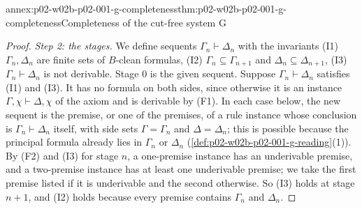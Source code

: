 \begin{annexitem}{annex:p02-w02b-p02-001-g-completeness}{thm:p02-w02b-p02-001-g-completeness}{Completeness of the cut-free system G}
\begin{proof}
\emph{Step 2: the stages.}  We define sequents \(\Gamma_n\vdash\Delta_n\)
with the invariants (I1) \(\Gamma_n,\Delta_n\) are finite sets of
\(B\)-clean formulas, (I2) \(\Gamma_n\subseteq\Gamma_{n+1}\) and
\(\Delta_n\subseteq\Delta_{n+1}\), (I3) \(\Gamma_n\vdash\Delta_n\) is not
derivable.  Stage \(0\) is the given sequent.  Suppose
\(\Gamma_n\vdash\Delta_n\) satisfies (I1) and (I3).  It has no formula on
both sides, since otherwise it is an instance \(\Gamma,\chi\vdash\Delta,\chi\)
of the axiom and is derivable by (F1).  In each case below, the new
sequent is the premise, or one of the premises, of a rule instance whose
conclusion is \(\Gamma_n\vdash\Delta_n\) itself, with side sets
\(\Gamma=\Gamma_n\) and \(\Delta=\Delta_n\); this is possible because the
principal formula already lies in \(\Gamma_n\) or \(\Delta_n\)
(\cref{def:p02-w02b-p02-001-g-reading}(1)).  By (F2) and (I3) for stage
\(n\), a one-premise instance has an underivable premise, and a two-premise
instance has at least one underivable premise; we take the first premise
listed if it is underivable and the second otherwise.  So (I3) holds at
stage \(n+1\), and (I2) holds because every premise contains
\(\Gamma_n\) and \(\Delta_n\).


\end{proof}
\end{annexitem}
